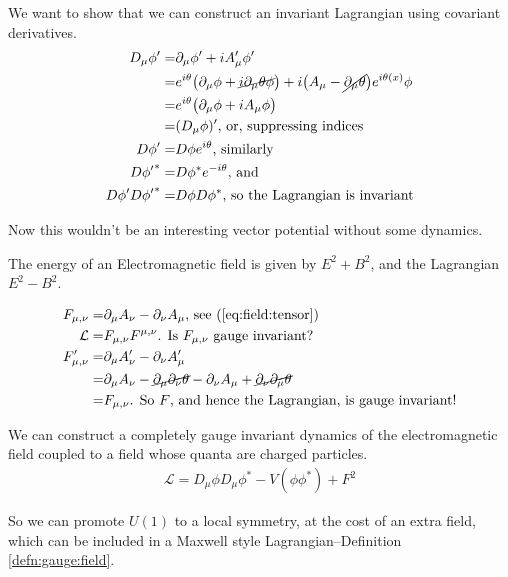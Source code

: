 \documentclass[]{article}
\begin{document}
We want to show that we can construct an invariant Lagrangian using covariant derivatives.
\begin{align*}
	D_\mu \phi^\prime =& \partial_\mu \phi^\prime + i A_\mu^\prime \phi^\prime\\
	=& e^{i\theta}\big(\partial_\mu \phi +\cancel{i\partial_\mu \theta \phi} \big) + i \big(A_\mu -\cancel{ \partial_\mu \theta} \big) e^{i \theta(x)} \phi\\
	=& e^{i\theta} \big( \partial_\mu \phi +i A_\mu \phi \big)\\
	=& (D_\mu \phi)^\prime \text{, or, suppressing indices}\\
	D \phi^\prime =&  D \phi  e^{i \theta} \text{, similarly}\\
	D {\phi^\prime}^* =& D {\phi}^*  e^{-i \theta} \text{, and}\\
	D \phi^\prime D {\phi^\prime}^*=& D \phi D {\phi}^* \text{, so the Lagrangian is invariant}
\end{align*}

Now this wouldn't be an interesting vector potential without some dynamics.

The energy of an Electromagnetic field is given by $E^2 + B^2$, and the Lagrangian $E^2-B^2$.

\begin{align*} 
	F_{\mu,\nu} =& \partial_\mu A_\nu - \partial_\nu A_\mu \text{, see (\ref{eq:field:tensor})}\\
	\mathcal{L} =& F_{\mu,\nu} F^{\mu,\nu} \text{. Is $F_{\mu,\nu}$ gauge invariant? }\\
	F_{\mu,\nu}^\prime =&\partial_\mu A_\nu^\prime - \partial_\nu A_\mu^\prime\\
	=& \partial_\mu A_\nu - \cancel{\partial_\mu \partial_\nu \theta}-\partial_\nu A_\mu + \cancel{\partial_\nu \partial_\mu \theta}\\
	=& 	F_{\mu,\nu} \text{. So $F$, and hence the Lagrangian, is gauge invariant!}
\end{align*}

We can construct a completely gauge invariant dynamics of the electromagnetic field coupled to a field whose quanta are charged particles.
\begin{align*}
	\mathcal{L} = D_\mu \phi D_\mu \phi^* -V(\phi\phi^*) + F^2
\end{align*}

So we can promote $U(1)$ to a local symmetry, at the cost of an extra field, which can be included in a Maxwell style Lagrangian--Definition \ref{defn:gauge:field}.
\end{document}
